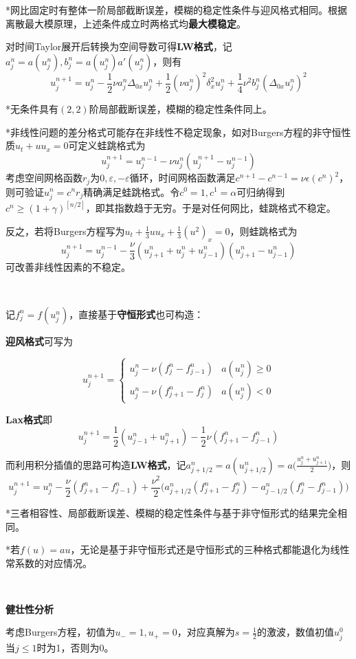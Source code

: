 \documentclass[a4paper,UTF8,fontset=windows]{ctexart}
\begin{document}
*网比固定时有整体一阶局部截断误差，模糊的稳定性条件与迎风格式相同。根据离散最大模原理，上述条件成立时两格式均\textbf{最大模稳定}。

对时间Taylor展开后转换为空间导数可得\textbf{LW格式}，记$a_j^n=a(u_j^n),b_j^n=a(u_j^n)a'(u_j^n)$，则有
$$u_j^{n+1}=u_j^n-\frac{1}{2}\nu a_j^n\Delta_{0x}u_j^n+\frac{1}{2}(\nu a_j^n)^2\delta_x^2u_j^n+\frac{1}{4}\nu^2b_j^n(\Delta_{0x}u_j^n)^2$$

*无条件具有$(2,2)$阶局部截断误差，模糊的稳定性条件同上。

*非线性问题的差分格式可能存在非线性不稳定现象，如对Burgers方程的非守恒性质$u_t+uu_x=0$可定义蛙跳格式为
$$u_j^{n+1}=u_j^{n-1}-\nu u_j^n(u_j^{n+1}-u_j^{n-1})$$
考虑空间网格函数$r_j$为$0,\varepsilon,-\varepsilon$循环，时间网格函数满足$c^{n+1}-c^{n-1}=\nu\epsilon(c^n)^2$，则可验证$u_j^n=c^nr_j$精确满足蛙跳格式。令$c^0=1,c^1=\alpha$可归纳得到$c^n\ge(1+\gamma)^{[n/2]}$，即其指数趋于无穷。于是对任何网比，蛙跳格式不稳定。

反之，若将Burgers方程写为$u_t+\frac{1}{3}uu_x+\frac{1}{3}(u^2)_x=0$，则蛙跳格式为
$$u_j^{n+1}=u_j^{n-1}-\frac{\nu}{3}(u_{j+1}^n+u_j^n+u_{j-1}^n)(u_{j+1}^n-u_{j-1}^n)$$
可改善非线性因素的不稳定。

\

记$f_j^n=f(u_j^n)$，直接基于\textbf{守恒形式}也可构造：

\textbf{迎风格式}可写为

$$u_j^{n+1}=\begin{cases}u_j^n-\nu(f_j^n-f_{j-1}^n)&a(u_j^n)\ge0\\u_j^n-\nu(f_{j+1}^n-f_j^n)&a(u_j^n)<0\end{cases}$$

\textbf{Lax格式}即
$$u_j^{n+1}=\frac{1}{2}(u_{j-1}^n+u_{j+1}^n)-\frac{1}{2}\nu(f_{j+1}^n-f_{j-1}^n)$$

而利用积分插值的思路可构造\textbf{LW格式}，记$a_{j+1/2}^n=a(u_{j+1/2}^n)=a\big(\frac{u_j^n+u_{j+1}^n}{2}\big)$，则
$$u_j^{n+1}=u_j^n-\frac{\nu}{2}(f_{j+1}^n-f_{j-1}^n)+\frac{\nu^2}{2}\big(a_{j+1/2}^n(f_{j+1}^n-f_j^n)-a_{j-1/2}^n(f_j^n-f_{j-1}^n)\big)$$

*三者相容性、局部截断误差、模糊的稳定性条件与基于非守恒形式的结果完全相同。

*若$f(u)=au$，无论是基于非守恒形式还是守恒形式的三种格式都能退化为线性常系数的对应情况。

\

\textbf{健壮性分析}

考虑Burgers方程，初值为$u_-=1,u_+=0$，对应真解为$s=\frac{1}{2}$的激波，数值初值$u_j^0$当$j\le1$时为1，否则为0。
\end{document}
